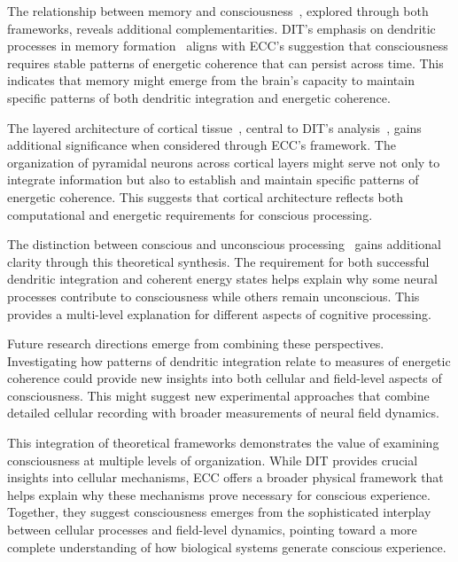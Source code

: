 The relationship between memory and consciousness~, explored through both frameworks, reveals additional complementarities. DIT's emphasis on dendritic processes in memory formation~\cite{Shin2021, Branco2010} aligns with ECC's suggestion that consciousness requires stable patterns of energetic coherence that can persist across time. This indicates that memory might emerge from the brain's capacity to maintain specific patterns of both dendritic integration and energetic coherence.

The layered architecture of cortical tissue~, central to DIT's analysis~\cite{Larkum2013, Larkum2022}, gains additional significance when considered through ECC's framework. The organization of pyramidal neurons across cortical layers might serve not only to integrate information but also to establish and maintain specific patterns of energetic coherence. This suggests that cortical architecture reflects both computational and energetic requirements for conscious processing.

The distinction between conscious and unconscious processing~ gains additional clarity through this theoretical synthesis. The requirement for both successful dendritic integration and coherent energy states helps explain why some neural processes contribute to consciousness while others remain unconscious. This provides a multi-level explanation for different aspects of cognitive processing.

Future research directions emerge from combining these perspectives. Investigating how patterns of dendritic integration relate to measures of energetic coherence could provide new insights into both cellular and field-level aspects of consciousness. This might suggest new experimental approaches that combine detailed cellular recording with broader measurements of neural field dynamics.

This integration of theoretical frameworks demonstrates the value of examining consciousness at multiple levels of organization. While DIT provides crucial insights into cellular mechanisms, ECC offers a broader physical framework that helps explain why these mechanisms prove necessary for conscious experience. Together, they suggest consciousness emerges from the sophisticated interplay between cellular processes and field-level dynamics, pointing toward a more complete understanding of how biological systems generate conscious experience.

